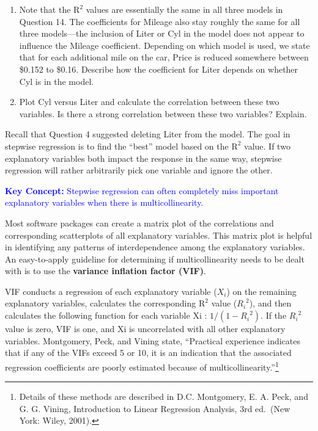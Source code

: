 \documentclass[
]{book}
\begin{document}
\begin{enumerate}
\def\labelenumi{\arabic{enumi}.}
\setcounter{enumi}{14}
\item
  Note that the \(\mathrm{R}^2\) values are essentially the same in all three models in Question 14. The coefficients for Mileage also stay roughly the same for all three models---the inclusion of Liter or Cyl in the model does not appear to influence the Mileage coefficient. Depending on which model is used, we state that for each additional mile on the car, Price is reduced somewhere between \$0.152 to \$0.16. Describe how the coefficient for Liter depends on whether Cyl is in the model.
\item
  Plot Cyl versus Liter and calculate the correlation between these two variables. Is there a strong correlation between these two variables? Explain.
\end{enumerate}

Recall that Question 4 suggested deleting Liter from the model. The goal in stepwise regression is to find the ``best'' model based on the \(\mathrm{R}^2\) value. If two explanatory variables both impact the response in the same way, stepwise regression will rather arbitrarily pick one variable and ignore the other.

\textbf{\textcolor{blue}{Key Concept:}}
\textcolor{blue}{Stepwise regression can often completely miss important explanatory variables when there is multicollinearity.}

Most software packages can create a matrix plot of the correlations and corresponding scatterplots of all explanatory variables. This matrix plot is helpful in identifying any patterns of interdependence among the explanatory variables. An easy-to-apply guideline for determining if multicollinearity needs to be dealt with is to use the \textbf{variance inflation factor (VIF)}.

VIF conducts a regression of each explanatory variable (\(X_i\)) on the remaining explanatory variables, calculates the corresponding \(\mathrm{R}^2\) value (\({R_i}^2\)), and then calculates the following function for each variable Xi : \(1/(1 - {R_i}^2)\). If the \({R_i}^2\) value is zero, VIF is one, and Xi is uncorrelated with all other explanatory variables. Montgomery, Peck, and Vining state, ``Practical experience indicates that if any of the VIFs exceed 5 or 10, it is an indication that the associated regression coefficients are poorly estimated because of multicollinearity.''\footnote{Details of these methods are described in D.C. Montgomery, E. A. Peck, and G. G. Vining, Introduction to Linear Regression Analysis, 3rd ed.~(New York: Wiley, 2001).}
\end{document}
